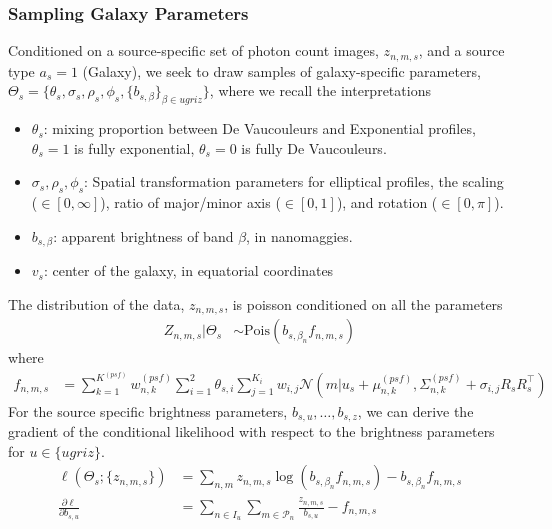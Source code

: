 \documentclass[11pt]{article}
\newcommand{\trans}{\intercal}
\begin{document}
\subsubsection{Sampling Galaxy Parameters}
Conditioned on a source-specific set of photon count images, $z_{n,m,s}$, and a source type $a_s = 1$ (Galaxy), we seek to draw samples of galaxy-specific parameters, $\Theta_s = \{ \theta_s, \sigma_s, \rho_s, \phi_s, \{b_{s,\beta}\}_{\beta \in ugriz} \}$, where we recall the interpretations
\begin{itemize}
\item $\theta_s$: mixing proportion between De Vaucouleurs and Exponential profiles, $\theta_s = 1$ is fully exponential, $\theta_s = 0$ is fully De Vaucouleurs.  
\item $\sigma_s, \rho_s, \phi_s$: Spatial transformation parameters for elliptical profiles, the scaling ($\in [0, \infty]$), ratio of major/minor axis ($\in [0, 1]$), and rotation ($\in [0, \pi]$).   
\item $b_{s,\beta}$: apparent brightness of band $\beta$, in nanomaggies.   
\item $v_s$: center of the galaxy, in equatorial coordinates
\end{itemize}

The distribution of the data, $z_{n,m,s}$, is poisson conditioned on all the parameters 
\begin{align}
  Z_{n,m,s} | \Theta_s 
    &\sim \textrm{Pois}(b_{s, \beta_n} f_{n,m,s}) 
\end{align}
where 
\begin{align}
  f_{n,m,s} &= \sum_{k=1}^{K^{(psf)}} w_{n,k}^{(psf)} \sum_{i=1}^2 \theta_{s,i} \sum_{j=1}^{K_i} w_{i,j} \mathcal{N} \left(m | u_s + \mu^{(psf)}_{n,k}, \Sigma^{(psf)}_{n,k} + \sigma_{i,j} R_s R_s^\trans \right)
\end{align}
For the source specific brightness parameters, $b_{s,u}, \dots, b_{s,z}$, we can derive the gradient of the conditional likelihood with respect to the brightness parameters for $u \in \{ugriz\}$.  
\begin{align}
  \ell(\Theta_s; \{z_{n,m,s}\}) &= \sum_{n,m} z_{n,m,s} \log\left( b_{s, \beta_n} f_{n,m,s} \right) - b_{s, \beta_n} f_{n,m,s}  \\
  \frac{\partial \ell}{\partial b_{s,u}} &= \sum_{n \in I_u} \sum_{m \in \mathcal{P}_n} \frac{z_{n,m,s}}{b_{s,u}} - f_{n,m,s}
\end{align}
\end{document}
